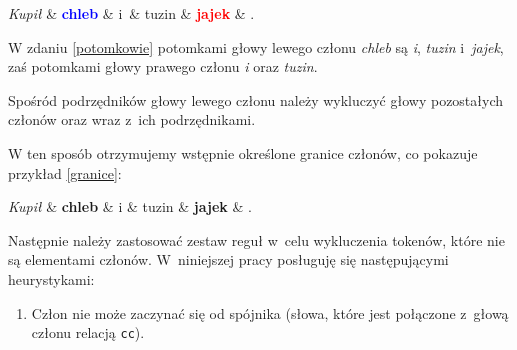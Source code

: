 \begin{exe}
\ex \label{potomkowie}
\begin{dependency}[baseline=-\the\dimexpr\fontdimen22\textfont2\relax]
\begin{deptext}[column sep=1em, row sep=.1ex]
\emph{Kupił} \& \textbf{\textcolor{blue}{chleb}} \& i~\& tuzin \& \textbf{\textcolor{red}{jajek}} \& .  \\ 
\end{deptext}
\end{dependency}
\end{exe}

W zdaniu \eqref{potomkowie} potomkami głowy lewego członu \textit{chleb} są \textit{i}, \textit{tuzin} i~\textit{jajek}, zaś potomkami głowy prawego członu \textit{i} oraz \textit{tuzin}.

Spośród podrzędników głowy lewego członu należy wykluczyć głowy pozostałych członów oraz wraz z~ich podrzędnikami.

W ten sposób otrzymujemy wstępnie określone granice członów, co pokazuje przykład \eqref{granice}:

\begin{exe}
\ex \label{granice}
\begin{dependency}[baseline=-\the\dimexpr\fontdimen22\textfont2\relax]
\begin{deptext}[column sep=1em, row sep=.1ex]
\emph{Kupił} \& \textbf{chleb} \& i \& tuzin \& \textbf{jajek} \& .  \\ 
\end{deptext}
\end{dependency}
\end{exe}

Następnie należy zastosować zestaw reguł w~celu wykluczenia tokenów, które nie są elementami członów. W~niniejszej pracy posługuję się następującymi heurystykami:

\begin{enumerate}
\item[\namedlabel{H1}{(H1)}]
Człon nie może zaczynać się od spójnika (słowa, które jest połączone z~głową członu relacją \texttt{cc}).
\end{enumerate}

